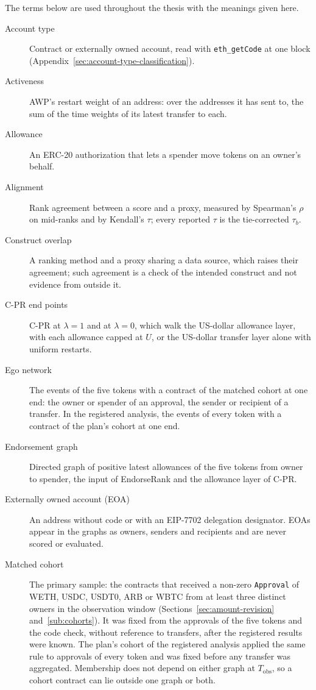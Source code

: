 
The terms below are used throughout the thesis with the meanings given here.

\begin{description}
\item[Account type] Contract or externally owned account, read with \texttt{eth\_getCode} at one block (Appendix~\ref{sec:account-type-classification}).
\item[Activeness] AWP's restart weight of an address: over the addresses it has sent to, the sum of the time weights of its latest transfer to each.
\item[Allowance] An ERC-20 authorization that lets a spender move tokens on an owner's behalf.
\item[Alignment] Rank agreement between a score and a proxy, measured by Spearman's $\rho$ on mid-ranks and by Kendall's $\tau$; every reported $\tau$ is the tie-corrected $\tau_b$.
\item[Construct overlap] A ranking method and a proxy sharing a data source, which raises their agreement; such agreement is a check of the intended construct and not evidence from outside it.
\item[C-PR end points] C-PR at $\lambda=1$ and at $\lambda=0$, which walk the US-dollar allowance layer, with each allowance capped at $U$, or the US-dollar transfer layer alone with uniform restarts.
\item[Ego network] The events of the five tokens with a contract of the matched cohort at one end: the owner or spender of an approval, the sender or recipient of a transfer. In the registered analysis, the events of every token with a contract of the plan's cohort at one end.
\item[Endorsement graph] Directed graph of positive latest allowances of the five tokens from owner to spender, the input of EndorseRank and the allowance layer of C-PR.
\item[Externally owned account (EOA)] An address without code or with an EIP-7702 delegation designator. EOAs appear in the graphs as owners, senders and recipients and are never scored or evaluated.
\item[Matched cohort] The primary sample: the contracts that received a non-zero \texttt{Approval} of WETH, USDC, USDT0, ARB or WBTC from at least three distinct owners in the observation window (Sections~\ref{sec:amount-revision} and~\ref{sub:cohorts}). It was fixed from the approvals of the five tokens and the code check, without reference to transfers, after the registered results were known. The plan's cohort of the registered analysis applied the same rule to approvals of every token and was fixed before any transfer was aggregated. Membership does not depend on either graph at $T_{\text{obs}}$, so a cohort contract can lie outside one graph or both.

\end{description}
